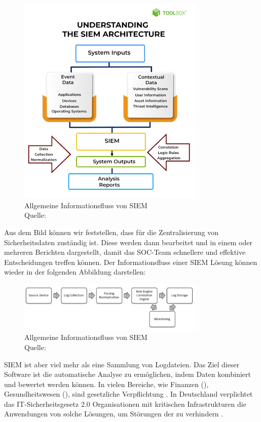 \begin{figure}[H]
   \centering
   \includegraphics[width=0.8\textwidth]{assets/2_p1.png}
   \caption{Allgemeine Informationsfluss von \gls{SIEM} \\Quelle: \citep{Mohanan_What} }
   \centering
\end{figure}

Aus dem Bild können wir feststellen, dass  für die Zentralisierung von Sicherheitsdaten zuständig ist. Diese werden dann bearbeitet und in einem oder mehreren Berichten dargestellt, damit das \gls{SOC}-Team schnellere und effektive Entscheidungen treffen können. Der Informationsfluss einer \gls{SIEM} Lösung können wieder in der folgenden Abbildung darstellen:

\begin{figure}[H]
   \centering
   \includegraphics[width=0.8\textwidth]{assets/2_p2.png}
   \caption{Allgemeine Informationsfluss von \gls{SIEM} \\Quelle: \citep{Granadillo_SIEM} }
   \centering
\end{figure}

\gls{SIEM} ist aber viel mehr als eine Sammlung von Logdateien. Das Ziel dieser Software ist die automatische Analyse zu ermöglichen, indem Daten kombiniert und bewertet werden können. In vielen Bereiche, wie Finanzen (), Gesundheitswesen (), sind  gesetzliche Verpflichtung \citep{Jog_SIEM}. In Deutschland verplichtet das \gls{IT-Sicherheitsgesetz 2.0} Organisationen mit kritischen Infrastrukturen die Anwendungen von solche Lösungen, um Störungen der  zu verhindern \citep{BSI_ITSG}.

